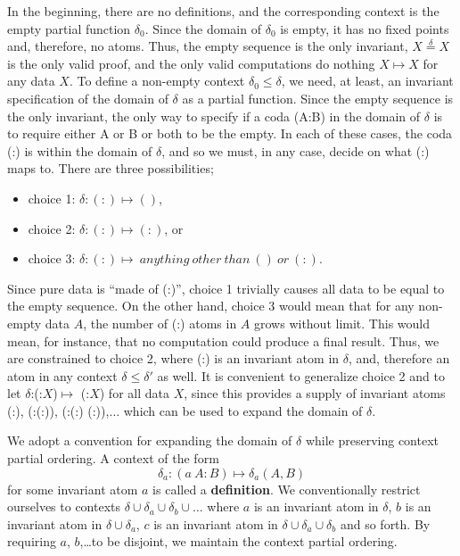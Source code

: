 \documentclass[11pt]{article}
\begin{document}
     In the beginning, there are no definitions, and the corresponding context is the empty partial function $\delta_0$.  
Since the domain of $\delta_0$ is empty, it has no fixed points and, therefore, no atoms.  Thus, the empty sequence is the only invariant, 
$X{\overset \delta =}X$ is the only valid proof, and the only valid 
 computations do nothing $X\mapsto X$ for any data $X$.
To define a non-empty context $\delta_0\le\delta$, we need, at least, an invariant specification of the domain of $\delta$ as a partial function.    
Since the empty sequence is the only invariant, the only way to specify if a coda (A:B) in the domain of $\delta$ is 
to require either A or B or both to be the empty. In each of these cases, the coda (:) is within the domain of $\delta$, and so we must, in any case, 
decide on what (:) maps to.  There are three possibilities; 
\begin{itemize}
\item[] choice 1: {$\delta: (:) \mapsto ()$},
\item[] choice 2: {$\delta: (:) \mapsto (:)$}, or 
\item[] choice 3: {$\delta: (:) \mapsto \ anything\ other\ than\ ()\ or\ (:)$}. 
\end{itemize}
Since pure data is ``made of (:)'', choice 1 trivially causes all data to be equal to the empty sequence. 
On the other hand, choice 3 would mean that for any non-empty data $A$, the number of (:) atoms in $A$ grows without limit.  This would mean, for instance, 
that no computation could produce a final result.  Thus, we are constrained to choice 2, where (:) is an invariant atom in $\delta$, and, therefore an atom in 
any context $\delta\leq\delta'$ as well.  It is convenient to generalize choice 2 and to let $\delta$:(:$X$)$\mapsto$ (:$X$) for all data $X$, since this provides a 
supply of invariant atoms (:), (:(:)), (:(:) (:)),$\dots$ which can be used to expand the domain of $\delta$.  

We adopt a convention for expanding the domain of $\delta$ while preserving context partial ordering. 
A context of the form 
\begin{equation}
	\delta_a: (a\ A:B) \mapsto \delta_a(A,B)
\end{equation}
for some invariant atom $a$ is called a {\bf definition}.  We conventionally restrict ourselves to 
contexts $\delta\cup\delta_a\cup\delta_b\cup\dots$ where $a$ is an invariant atom in $\delta$, $b$ is an invariant atom in $\delta\cup\delta_a$, $c$ is an invariant atom in $\delta\cup\delta_a\cup\delta_b$ and so forth.  By requiring $a$, $b$,\dots to be disjoint, we maintain the context partial ordering.  
\end{document}
